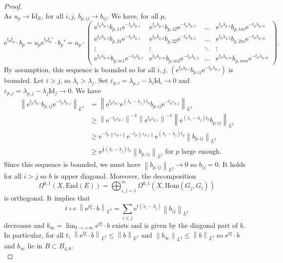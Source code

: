 \documentclass{article}
\theoremstyle{remark}
\theoremstyle{definition}
\newcommand{\Hom}{\mathrm{Hom}}
\newcommand{\End}{\mathrm{End}}
\newcommand{\Id}{\mathrm{Id}}
\newcommand{\e}{\boldsymbol{\mathrm{e}}}
\newcommand{\norme}[1]{\left\| #1 \right\|}
\renewcommand{\leq}{\leqslant}
\renewcommand{\geq}{\geqslant}
\begin{document}
\begin{proof}
$$$$
As $u_p \rightarrow \Id_E$, for all $i,j$, $b_{p,ij} \rightarrow b_{ij}$. We have, for all $p$,
$$
\e^{t_p\xi_p} \cdot b_p = u_p\e^{t_p\xi_p'} \cdot b_p' = u_p \cdot
\begin{pmatrix}
    \e^{t_p\lambda_{p,1}}b_{p,11}\e^{-t_p\lambda_{p,1}} & \e^{t_p\lambda_{p,1}}b_{p,12}\e^{-t_p\lambda_{p,2}} & \hdots & \e^{t_p\lambda_{p,1}}b_{p,1m}\e^{-t_p\lambda_{p,m}}\\
    \e^{t_p\lambda_{p,2}}b_{p,21}\e^{-t_p\lambda_{p,1}} & \e^{t_p\lambda_{p,2}}b_{p,22}\e^{-t_p\lambda_{p,2}} & \hdots & \e^{t_p\lambda_{p,2}}b_{p,2m}\e^{-t_p\lambda_{p,m}}\\
    \vdots & \vdots & \ddots & \vdots\\
    \e^{t_p\lambda_{p,m}}b_{p,m1}\e^{-t_p\lambda_{p,1}} & \e^{t_p\lambda_{p,m}}b_{p,m2}\e^{-t_p\lambda_{p,2}} & \hdots & \e^{t_p\lambda_{p,m}}b_{p,mm}\e^{-t_p\lambda_{p,m}}
\end{pmatrix}.
$$
By assumption, this sequence is bounded so for all $i,j$, $(\e^{t_p\lambda_{p,i}}b_{p,ij}\e^{-t_p\lambda_{p,j}})$ is bounded. Let $i > j$, so $\lambda_i > \lambda_j$. Set $\varepsilon_{p,i} = \lambda_{p,i} - \lambda_i\Id_i \rightarrow 0$ and $\varepsilon_{p,j} = \lambda_{p,j} - \lambda_j\Id_j \rightarrow 0$. We have
\begin{align*}
    \norme{\e^{t_p\lambda_{p,i}}b_{p,ij}\e^{-t_p\lambda_{p,j}}}_{L^2} & = \norme{\e^{t_p\varepsilon_{p,i}}\e^{(\lambda_i - \lambda_j)t_p}b_{p,ij}\e^{-t_p\varepsilon_{p,j}}}_{L^2}\\
    & \geq \norme{\e^{-t_p\varepsilon_{p,i}}}^{-1}\norme{\e^{t_p\varepsilon_{p,j}}}^{-1}\norme{\e^{(\lambda_i - \lambda_j)t_p}b_{p,ij}}_{L^2}\\
    & \geq \e^{-t_p\norme{\varepsilon_{p,i}}}\e^{-t_p\norme{\varepsilon_{p,j}}}\e^{(\lambda_i - \lambda_j)t_p}\norme{b_{p,ij}}_{L^2}\\
    & \geq \e^{\frac{1}{2}(\lambda_i - \lambda_j)t_p}\norme{b_{p,ij}}_{L^2} \textrm{ for $p$ large enough.}
\end{align*}
Since this sequence is bounded, we must have $\norme{b_{p,ij}}_{L^2} \rightarrow 0$ so $b_{ij} = 0$. It holds for all $i > j$ so $b$ is upper diagonal. Moreover, the decomposition
$$
\Omega^{0,1}(X,\End(E)) = \bigoplus_{i,j = 1}^m \Omega^{0,1}(X,\Hom(G_j,G_i))
$$
is orthogonal. It implies that
$$
t \mapsto \norme{\e^{t\xi} \cdot b}_{L^2} = \sum_{i \leq j} \e^{t(\lambda_i - \lambda_j)}\norme{b_{ij}}_{L^2}
$$
decreases and $b_\infty = \lim_{t \rightarrow +\infty} \e^{t\xi} \cdot b$ exists and is given by the diagonal part of $b$. In particular, for all $t$, $\norme{\e^{t\xi} \cdot b}_{L^2} \leq \norme{b}_{L^2}$ and $\norme{b_\infty}_{L^2} \leq \norme{b}_{L^2}$ so $\e^{t\xi} \cdot b$ and $b_\infty$ lie in $B \subset B_{4,0}$.\\


\end{proof}
\end{document}

